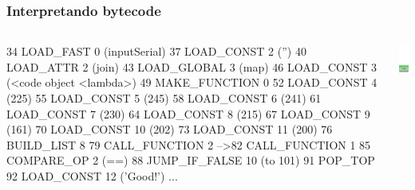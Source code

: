 \documentclass[9pt, notes=hide]{beamer}
\begin{document}
\begin{frame}[fragile]
    \frametitle{Interpretando bytecode}
        \begin{columns}[T]
            \begin{column}{.8\textwidth}
\begin{python}
   34  LOAD_FAST          0 (inputSerial)
   37  LOAD_CONST         2 ('')
   40  LOAD_ATTR          2 (join)
   43  LOAD_GLOBAL        3 (map)
   46  LOAD_CONST         3 (<code object <lambda>)
   49  MAKE_FUNCTION      0
   52  LOAD_CONST         4 (225)
   55  LOAD_CONST         5 (245)
   58  LOAD_CONST         6 (241)
   61  LOAD_CONST         7 (230)
   64  LOAD_CONST         8 (215)
   67  LOAD_CONST         9 (161)
   70  LOAD_CONST        10 (202)
   73  LOAD_CONST        11 (200)
   76  BUILD_LIST         8
   79  CALL_FUNCTION      2
-->82  CALL_FUNCTION      1
   85  COMPARE_OP         2 (==)
   88  JUMP_IF_FALSE     10 (to 101)
   91  POP_TOP
   92  LOAD_CONST        12 ('Good!')
   ...
\end{python}

            \end{column}
            \begin{column}{.3\textwidth}
                \includegraphics[width=2.5cm]{images/stack-5.png}
            \end{column}
        \end{columns}

\end{frame}
\end{document}
